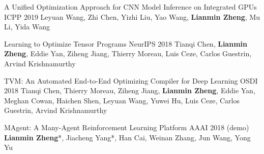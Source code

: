 \begin{cventries}
\cventry
{}
{A Unified Optimization Approach for CNN Model Inference on Integrated GPUs} %
{ICPP 2019} %
{} %
{Leyuan Wang, Zhi Chen, Yizhi Liu, Yao Wang, \textbf{Lianmin Zheng}, Mu Li, Yida Wang}

\cventry
{}
{Learning to Optimize Tensor Programs} %
{NeurIPS 2018} %
{} %
{Tianqi Chen, \textbf{Lianmin Zheng}, Eddie Yan, Ziheng Jiang, Thierry Moreau, Luis Ceze, Carlos Guestrin, Arvind Krishnamurthy}

\cventry
{}
{TVM: An Automated End-to-End Optimizing Compiler for Deep Learning} %
{OSDI 2018} %
{} %
{Tianqi Chen, Thierry Moreau, Ziheng Jiang, \textbf{Lianmin Zheng}, Eddie Yan, Meghan Cowan, Haichen Shen, Leyuan Wang, Yuwei Hu, Luis Ceze, Carlos Guestrin, Arvind Krishnamurthy}

\cventry
{}
{MAgent: A Many-Agent Reinforcement Learning Platform} %
{AAAI 2018 (demo)} %
{} %
{\textbf{Lianmin Zheng}*, Jiacheng Yang*, Han Cai, Weinan Zhang, Jun Wang, Yong Yu}

\end{cventries}
